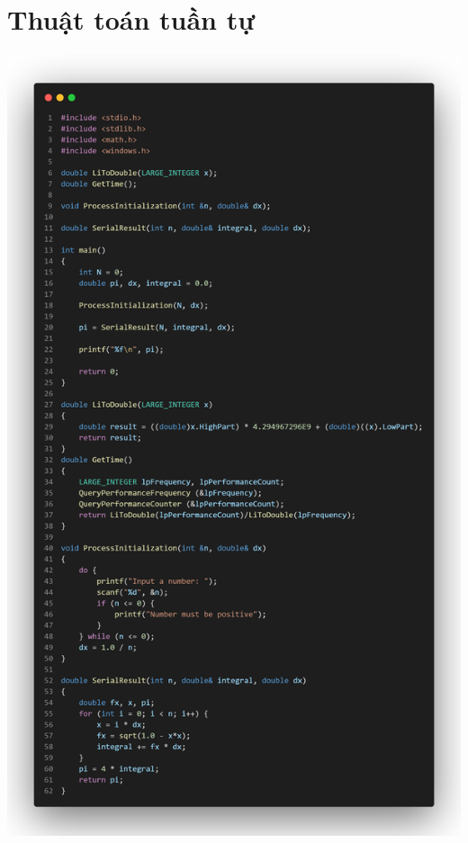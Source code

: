 \documentclass[12pt,a4paper]{report}
\begin{document}
\section{Thuật toán tuần tự}
\begin{center}
	\includegraphics[trim=0in 13in 0in 0in, clip, scale=0.25]{./Photos/PI/serial.PNG}
\clearpage

\end{center}
\end{document}
